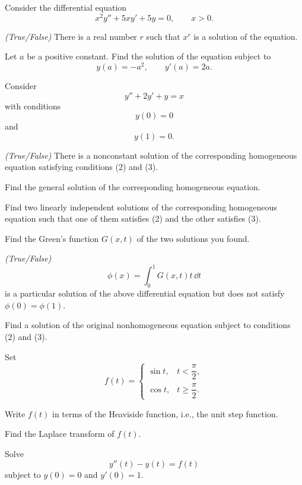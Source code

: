 \documentclass[11pt,oneside]{article}
\begin{document}
\begin{problem}
Consider the differential equation
\[
x^2y''+5xy'+5y=0,
\qquad x>0.
\]
\begin{problemsubparts}
\item \textit{(True/False)} There is a real number $r$ such that $x^r$ is a solution of the equation.
\item Let $a$ be a positive constant. Find the solution of the equation subject to
\[
y(a)=-a^2,
\qquad
y'(a)=2a.
\]
\end{problemsubparts}
\end{problem}

\begin{problem}
Consider
\[
y''+2y'+y=x
\]
with conditions
\[
y(0)=0 \tag{2}
\]
and
\[
y(1)=0. \tag{3}
\]
\begin{problemsubparts}
\item \textit{(True/False)} There is a nonconstant solution of the corresponding homogeneous equation satisfying conditions (2) and (3).
\item Find the general solution of the corresponding homogeneous equation.
\item Find two linearly independent solutions of the corresponding homogeneous equation such that one of them satisfies (2) and the other satisfies (3).
\item Find the Green's function $G(x,t)$ of the two solutions you found.
\item \textit{(True/False)}
\[
\phi(x)=\int_0^1G(x,t)t\,\dd t
\]
is a particular solution of the above differential equation but does not satisfy $\phi(0)=\phi(1)$.
\item Find a solution of the original nonhomogeneous equation subject to conditions (2) and (3).
\end{problemsubparts}
\end{problem}

\begin{problem}
Set
\[
f(t)=
\begin{cases}
\sin t, & t<\dfrac{\pi}{2},\\[0.4em]
\cos t, & t\ge\dfrac{\pi}{2}.
\end{cases}
\]
\begin{problemsubparts}
\item Write $f(t)$ in terms of the Heaviside function, i.e., the unit step function.
\item Find the Laplace transform of $f(t)$.
\item Solve
\[
y''(t)-y(t)=f(t)
\]
subject to $y(0)=0$ and $y'(0)=1$.
\end{problemsubparts}
\end{problem}
\end{document}
